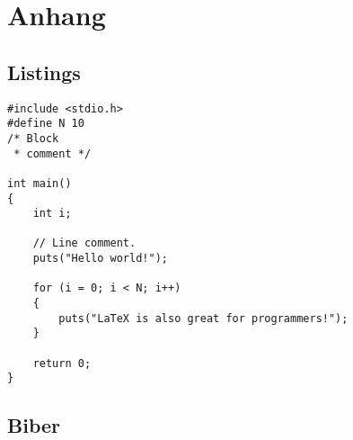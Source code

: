 \documentclass[12pt,DIV=15,BCOR=15mm,twoside,headsepline,abstract=true,listof=totoc,bibliography=totoc]{scrreprt}
\begin{document}
\appendix

\printbibliography %


\eigenstaenigkeitserklaerung

\cleardoublepage

\chapter{Anhang}
\section{Listings}

\lstset{language=C}
 \begin{lstlisting}[caption=C Code - direkt eingefügt, label=list:C]
#include <stdio.h>
#define N 10
/* Block
 * comment */

int main()
{
    int i;

    // Line comment.
    puts("Hello world!");
    
    for (i = 0; i < N; i++)
    {
        puts("LaTeX is also great for programmers!");
    }

    return 0;
}
\end{lstlisting}




\lstset{language=Java}



% 

\section{Biber}
\label{sec:biber}

\end{document}

